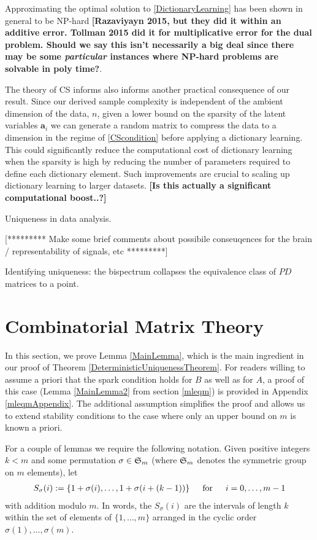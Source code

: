 \documentclass[journal, onecolumn]{IEEEtran}
\begin{document}
Approximating the optimal solution to \eqref{DictionaryLearning} has been shown in general to be NP-hard \cite{Razaviyayn} \textbf{[Razaviyayn 2015, but they did it within an additive error. Tollman 2015 did it for multiplicative error for the dual problem. Should we say this isn't necessarily a big deal since there may be some \emph{particular} instances where NP-hard problems are solvable in poly time?}. 

The theory of CS informs also informs another practical consequence of our result. Since our derived sample complexity is independent of the ambient dimension of the data, $n$, given a lower bound on the sparsity of the latent variables $\mathbf{a}_i$ we can generate a random matrix to compress the data to a dimension in the regime of \eqref{CScondition} before applying a dictionary learning. This could significantly reduce the computational cost of dictionary learning when the sparsity is high by reducing the number of parameters required to define each dictionary element. Such improvements are crucial to scaling up dictionary learning to larger datasets. \textbf{[Is this actually a significant computational boost..?]}

Uniqueness in data analysis.

[********* Make some brief comments about possibile conseuqences for the brain / representability of signals, etc *********]


Identifying uniqueness: the bispectrum collapses the equivalence class of $PD$ matrices to a point.


\appendices
\section{Combinatorial Matrix Theory}\label{appendixA}

In this section, we prove Lemma \ref{MainLemma}, which is the main ingredient in our proof of Theorem \ref{DeterministicUniquenessTheorem}. For readers willing to assume a priori that the spark condition holds for $B$ as well as for $A$, a proof of this case (Lemma \ref{MainLemma2} from section \ref{mleqm}) is provided in Appendix \ref{mleqmAppendix}. The additional assumption simplifies the proof and allows us to extend stability conditions to the case where only an upper bound on $m$ is known a priori. 

For a couple of lemmas we require the following notation. Given positive integers $k < m$ and some permutation $\sigma \in \frak{S}_m$ (where $\frak{S}_m$ denotes the symmetric group on $m$ elements), let
\begin{align}
S_\sigma(i) := \{1+\sigma(i), \ldots, 1+\sigma(i + (k-1)) \} \indent \text{for} \indent i = 0, \ldots, m-1
\end{align}
%
with addition modulo $m$. In words, the $S_\sigma(i)$ are the intervals of length $k$ within the set of elements of $\{1, \ldots, m\}$ arranged in the cyclic order $\sigma(1), \ldots, \sigma(m)$.
\end{document}

